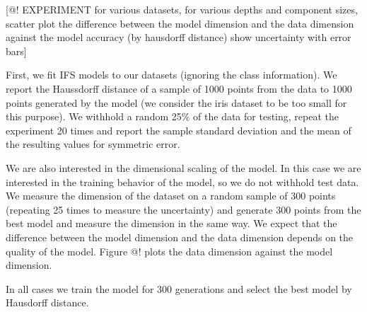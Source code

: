 \documentclass[10pt,a4paper,oneside]{article}
\theoremstyle{definition}
\begin{document}
[@! EXPERIMENT for various datasets, for various depths and component sizes, scatter plot the difference between the model dimension and the data dimension against the model accuracy (by hausdorff distance) show uncertainty with error bars]

First, we fit IFS models to our datasets (ignoring the class information). We report the Haussdorff distance of a sample of 1000 points from the data to 1000 points generated by the model (we consider the iris dataset to be too small for this purpose). We withhold a random 25\% of the data for testing, repeat the experiment 20 times and report the sample standard deviation and the mean of the resulting values for symmetric error.

We are also interested in the dimensional scaling of the model. In this case we are interested in the training behavior of the model, so we do not withhold test data. We measure the dimension of the dataset on a random sample of 300 points (repeating 25 times to measure the uncertainty) and generate 300 points from the best model and measure the dimension in the same way. We expect that the difference between the model dimension and the data dimension depends on the quality of the model. Figure @! plots the data dimension against the model dimension. 


In all cases we train the model for 300 generations and select the best model by Hausdorff distance. 
\end{document}
